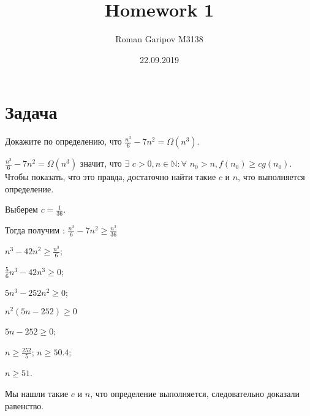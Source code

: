 \documentclass{article}
\title{Homework 1}
\date{22.09.2019}
\author{Roman Garipov M3138}
\begin{document}
  \maketitle
  \newpage

\section{Задача }
Докажите по определению, что 	$ \frac{n^{3}}{6} - 7n^{2} = \Omega(n^{3})$.
$$$$


   $ \frac{n^{3}}{6} - 7n^{2} = \Omega(n^{3})$ значит, что $ \exists $ $c > 0,  n \in \mathbb{N}: \forall$ $n_{0} > n, f(n_{0}) \geqslant cg(n_{0})$. 
   Чтобы показать, что это правда, достаточно найти такие $c$ и $n$, что выполняется определение. 
\begin{center}
	Выберем $c = \frac{1}{36}$. 
   
   Тогда получим : $ \frac{n^{3}}{6} - 7n^{2} \geqslant \frac{n^{3}}{36} $
   
    $n^{3} - 42n^{2} \geqslant \frac{n^{3}}{6}$; 
    
    $\frac{5}{6}n^{3} - 42n^{3} \geqslant 0$;
    
     $5n^{3} - 252n^{2} \geqslant 0$; 
     
      $n^{2}(5n - 252) \geqslant 0$ 
    
     $5n - 252 \geqslant 0$; 
     
     $n \geqslant \frac{252}{5}$; $ n \geqslant 50.4$; 
     
     $n \geqslant 51$.
\end{center}     
      Мы нашли такие $c$ и $n$, что определение выполняется, следовательно доказали равенство.
      
\end{document}
